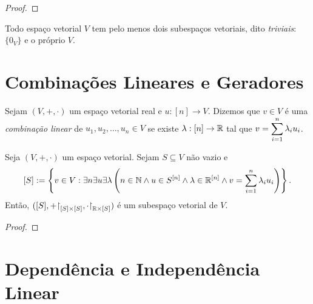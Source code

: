 \begin{proof}
    \blackproof
\end{proof}

\begin{example}
    Todo espaço vetorial $V$ tem pelo menos dois subespaços vetoriais, dito \emph{triviais}: $\{0_V\}$ e o próprio $V$.
\end{example}

\section{Combinações Lineares e Geradores}

\begin{definition}
    Sejam $(V, +, \cdot)$ um espaço vetorial real e $u : [n] \to V$. Dizemos que $v \in V$ é uma \emph{combinação linear} de $u_1, u_2 , \ldots, u_n \in V$ se existe $\lambda : [n] \to \mathbb{R}$ tal que $\displaystyle v = \sum_{i=1}^{n} \lambda_i u_i$.
\end{definition}

\begin{proposition}
    Seja $(V, +, \cdot)$ um espaço vetorial. Sejam $S \subseteq V$ não vazio e
        \[
            [S] := \left\{v \in V : \exists n \exists u \exists \lambda \left(n \in \mathbb{N} \land u \in S^{[n]} \land \lambda \in \mathbb{R}^{[n]} \land v = \sum_{i=1}^{n} \lambda_i u_i \right) \right\}.
        \]
    Então, $([S], + \restriction_{[S] \times [S]}, \cdot \restriction_{\R \times [S]})$ é um subespaço vetorial de $V$.
\end{proposition}

\begin{proof}
    \blackproof
\end{proof}

\section{Dependência e Independência Linear}

